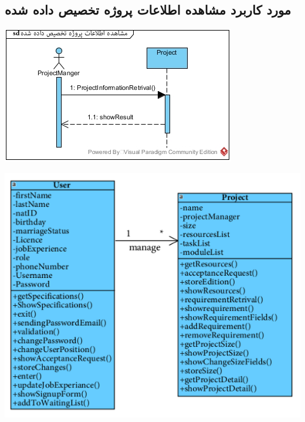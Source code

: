 \newpage
\vspace{2cm}
\subsection*{مورد کاربرد مشاهده اطلاعات پروژه تخصیص داده شده}
\vspace{2cm}
\begin{center}
\includegraphics[width=\textwidth]{SequenceDiagrams/17.jpg}
\end{center}

\newpage
\vspace{2cm}
\begin{center}
\includegraphics[width=\textwidth]{SequenceClasses/17.png}
\end{center}

\newpage
\vspace{2cm}
